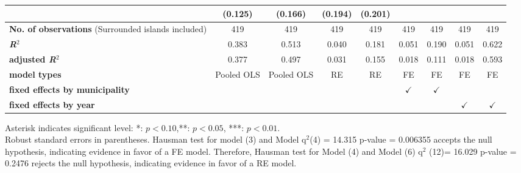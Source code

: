 \begin{sidewaystable}[!htbp]
{\begin{threeparttable}
\begin{tabular}{lcccccccc}
                                  & (0.125)       & (0.166)      & (0.194)       & (0.201)      &               &               &               & \tabularnewline
\midrule 
\textbf{No. of observations} (Surrounded islands included)        & 419        & 419        & 419       & 419       & 419         & 419          & 419          & 419\tabularnewline
\textbf{\textit{R}}$^{2}$                                         & 0.383      & 0.513      & 0.040     & 0.181     & 0.051       & 0.190        & 0.051        & 0.622\tabularnewline
\textbf{adjusted \textit{R}}$^{2}$                                & 0.377      & 0.497      & 0.031     & 0.155     & 0.018       & 0.111        & 0.018        & 0.593\tabularnewline
\textbf{model types}                                     & Pooled OLS & Pooled OLS & RE        & RE        &  FE         & FE           & FE           & FE\tabularnewline
\textbf{fixed effects by municipality}                      &            &            &           &           & $\checkmark$& $\checkmark$ &              &             \tabularnewline
\textbf{fixed effects by year}                              &            &            &           &           &             &              & $\checkmark$ & $\checkmark$\tabularnewline
\midrule
\end{tabular}
\begin{tablenotes}
Asterisk indicates significant level: *: \(p<0.10\),**: \(p<0.05\), ***: \(p<0.01\). \\ Robust standard errors in parentheses. Hausman test for model (3) and Model \textgreek{q}$^{2}$(4) = 14.315 p-value = 0.006355 accepts the null hypothesis, indicating evidence in favor of a FE model. Therefore, Hausman test for Model (4) and Model (6) \textgreek{q}$^{2}$ (12)= 16.029 p-value = 0.2476 rejects the null hypothesis, indicating evidence in favor of a RE model.
\end{tablenotes}
    \end{threeparttable}}
        \end{sidewaystable}